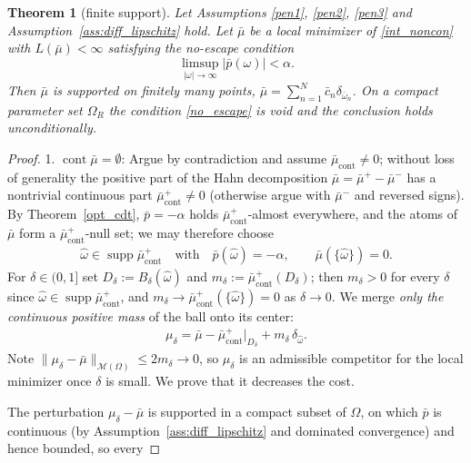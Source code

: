 \documentclass[11pt]{amsart}
\newtheorem{theorem}{Theorem}[section]
\theoremstyle{definition}
\theoremstyle{remark}
\DeclareMathOperator{\cont}{cont}
\DeclareMathOperator{\supp}{supp}
\begin{document}
\begin{theorem}[finite support]\label{thm:finite_support}
	Let Assumptions \ref{pen1}, \ref{pen2}, \ref{pen3} and
	Assumption~\ref{ass:diff_lipschitz} hold. Let $\bar{\mu}$ be a local
	minimizer of \eqref{int_noncon} with $L(\bar{\mu}) < \infty$ satisfying the
	\emph{no-escape condition}
	\begin{equation*}
		\tag{$H$}\label{no_escape}
		\limsup_{|\omega| \rightarrow \infty} |\bar{p}(\omega)| < \alpha.
	\end{equation*}
	Then $\bar{\mu}$ is supported on finitely many points,
	$\bar{\mu} = \sum_{n = 1}^N \bar{c}_n \delta_{\bar{\omega}_n}$. On a compact
	parameter set $\Omega_R$ the condition \eqref{no_escape} is void and the
	conclusion holds unconditionally.
\end{theorem}
\begin{proof}
1. $\cont\bar{\mu} = \emptyset$: Argue by contradiction and assume
$\bar{\mu}_{\cont} \neq 0$; without loss of generality the positive part of the
Hahn decomposition $\bar{\mu} = \bar{\mu}^+ - \bar{\mu}^-$ has a nontrivial
continuous part $\bar{\mu}^+_{\cont} \neq 0$ (otherwise argue with
$\bar{\mu}^-$ and reversed signs). By Theorem~\ref{opt_cdt},
$\bar{p} = -\alpha$ holds $\bar{\mu}^+_{\cont}$-almost everywhere, and the
atoms of $\bar{\mu}$ form a $\bar{\mu}^+_{\cont}$-null set; we may therefore
choose
\begin{align*}
	\hat{\omega} \in \supp \bar{\mu}^+_{\cont}
	\quad \text{with} \quad
	\bar{p}(\hat{\omega}) = -\alpha, \qquad \bar{\mu}(\{\hat{\omega}\}) = 0.
\end{align*}
For $\delta \in (0, 1]$ set $D_\delta := B_\delta(\hat{\omega})$ and
$m_\delta := \bar{\mu}^+_{\cont}(D_\delta)$; then $m_\delta > 0$ for every
$\delta$ since $\hat{\omega} \in \supp \bar{\mu}^+_{\cont}$, and
$m_\delta \rightarrow \bar{\mu}^+_{\cont}(\{\hat{\omega}\}) = 0$ as
$\delta \rightarrow 0$. We merge \emph{only the continuous positive mass} of
the ball onto its center:
\begin{align*}
	\mu_\delta = \bar{\mu} - \bar{\mu}^+_{\cont}|_{D_\delta} + m_\delta \, \delta_{\hat{\omega}}.
\end{align*}
Note $\|\mu_\delta - \bar{\mu}\|_{\mathcal{M}(\Omega)} \le 2 m_\delta \rightarrow 0$,
so $\mu_\delta$ is an admissible competitor for the local minimizer once
$\delta$ is small. We prove that it decreases the cost. \par
The perturbation $\mu_\delta - \bar{\mu}$ is supported in a compact subset of
$\Omega$, on which $\bar{p}$ is continuous (by Assumption~\ref{ass:diff_lipschitz} and dominated convergence) and hence bounded, so every

\end{proof}
\end{document}
